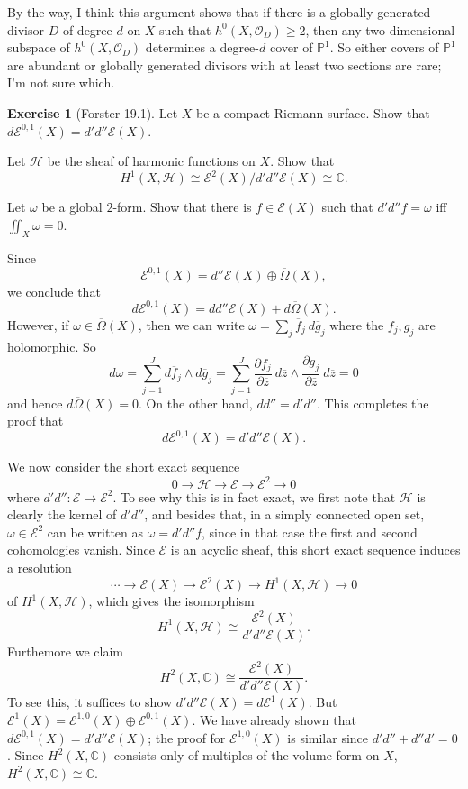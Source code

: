 \documentclass[10pt]{article}
\newcommand{\CC}{\mathbb{C}}
\newcommand{\PP}{\mathbb P}
\newcommand{\Olo}{\mathscr O}
\theoremstyle{definition}
\newtheorem{exer}{Exercise}
\begin{document}
By the way, I think this argument shows that if there is a globally generated divisor $D$ of degree $d$ on $X$ such that $h^0(X, \Olo_D) \geq 2$, then any two-dimensional subspace of $h^0(X, \Olo_D)$ determines a degree-$d$ cover of $\PP^1$.
So either covers of $\PP^1$ are abundant or globally generated divisors with at least two sections are rare; I'm not sure which.

\begin{exer}[Forster 19.1]
Let $X$ be a compact Riemann surface. Show that $d\mathscr E^{0,1}(X) = d'd'' \mathscr E(X)$.

Let $\mathscr H$ be the sheaf of harmonic functions on $X$. Show that
$$H^1(X, \mathscr H) \cong \mathscr E^2(X)/d'd'' \mathscr E(X) \cong \CC.$$

Let $\omega$ be a global $2$-form. Show that there is $f \in \mathscr E(X)$ such that $d' d'' f = \omega$ iff $\iint_X \omega = 0$.
\end{exer}

Since
$$\mathscr E^{0,1}(X) = d'' \mathscr E(X) \oplus \overline \Omega(X),$$
we conclude that
$$d\mathscr E^{0,1}(X) = dd'' \mathscr E(X) + d\overline \Omega(X).$$
However, if $\omega \in \overline \Omega(X)$, then we can write $\omega = \sum_j \overline f_j ~d\overline g_j$ where the $f_j,g_j$ are holomorphic.
So
$$d\omega = \sum_{j=1}^J d\overline f_j \wedge d\overline g_j = \sum_{j=1}^J \frac{\partial f_j}{\partial \overline z} ~d\overline z \wedge \frac{\partial g_j}{\partial \overline z} ~d\overline z = 0$$
and hence $d\overline \Omega(X) = 0$. On the other hand, $dd'' = d'd''$. This completes the proof that
$$d\mathscr E^{0,1}(X) = d'd'' \mathscr E(X).$$

We now consider the short exact sequence
$$0 \to \mathscr H \to \mathscr E \to \mathscr E^2 \to 0$$
where $d'd'': \mathscr E \to \mathscr E^2$. To see why this is in fact exact, we first note that $\mathscr H$ is clearly the kernel of $d'd''$, and besides that, in a simply connected open set, $\omega \in \mathscr E^2$ can be written as $\omega = d'd''f$, since in that case the first and second cohomologies vanish.
Since $\mathscr E$ is an acyclic sheaf, this short exact sequence induces a resolution
$$\cdots \to \mathscr E(X) \to \mathscr E^2(X) \to H^1(X, \mathscr H) \to 0$$
of $H^1(X, \mathscr H)$, which gives the isomorphism
$$H^1(X, \mathscr H) \cong \frac{\mathscr E^2(X)}{d'd''\mathscr E(X)}.$$
Furthemore we claim
$$H^2(X, \CC) \cong \frac{\mathscr E^2(X)}{d'd''\mathscr E(X)}.$$
To see this, it suffices to show $d'd'' \mathscr E(X) = d\mathscr E^1(X)$.
But $\mathscr E^1(X) = \mathscr E^{1, 0}(X) \oplus \mathscr E^{0, 1}(X)$.
We have already shown that $d\mathscr E^{0,1}(X) = d'd'' \mathscr E(X)$; the proof for $\mathscr E^{1,0}(X)$ is similar since $d'd'' + d''d' = 0$.
Since $H^2(X, \CC)$ consists only of multiples of the volume form on $X$, $H^2(X, \CC) \cong \CC$.
\end{document}
